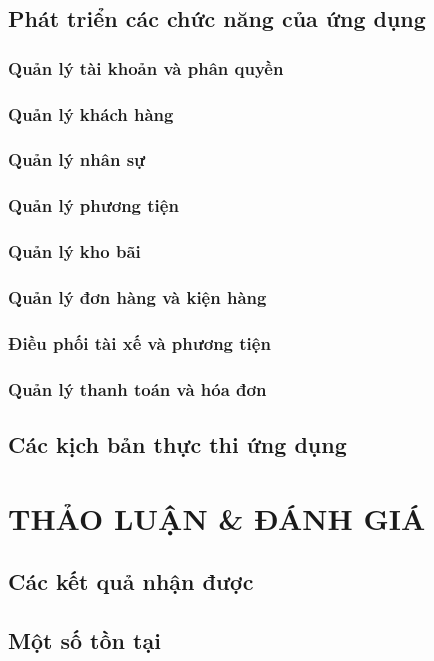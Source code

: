 \documentclass[12pt,a4paper]{article}
\begin{document}
\subsection{Phát triển các chức năng của ứng dụng}
\subsubsection{Quản lý tài khoản và phân quyền}
\subsubsection{Quản lý khách hàng}
\subsubsection{Quản lý nhân sự}
\subsubsection{Quản lý phương tiện}
\subsubsection{Quản lý kho bãi}
\subsubsection{Quản lý đơn hàng và kiện hàng}
\subsubsection{Điều phối tài xế và phương tiện}
\subsubsection{Quản lý thanh toán và hóa đơn}

\subsection{Các kịch bản thực thi ứng dụng}

\newpage

\section{THẢO LUẬN \& ĐÁNH GIÁ}
\subsection{Các kết quả nhận được}
\subsection{Một số tồn tại}
\end{document}
